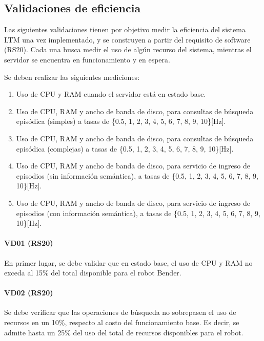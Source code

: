 \subsection{Validaciones de eficiencia}




Las siguientes validaciones tienen por objetivo medir la eficiencia del sistema LTM una vez implementado, y se construyen a partir del requisito de software (RS20). Cada una busca medir el uso de algún recurso del sistema, mientras el servidor se encuentra en funcionamiento y en espera. 

Se deben realizar las siguientes mediciones:
\begin{enumerate}
\item Uso de CPU y RAM cuando el servidor está en estado base.
\item Uso de CPU, RAM y ancho de banda de disco, para consultas de búsqueda episódica (simples) a tasas de \{0.5, 1, 2, 3, 4, 5, 6, 7, 8, 9, 10\}[Hz].
\item Uso de CPU, RAM y ancho de banda de disco, para consultas de búsqueda episódica (complejas) a tasas de \{0.5, 1, 2, 3, 4, 5, 6, 7, 8, 9, 10\}[Hz].
\item Uso de CPU, RAM y ancho de banda de disco, para servicio de ingreso de episodios (sin información semántica), a tasas de \{0.5, 1, 2, 3, 4, 5, 6, 7, 8, 9, 10\}[Hz].
\item Uso de CPU, RAM y ancho de banda de disco, para servicio de ingreso de episodios (con información semántica), a tasas de \{0.5, 1, 2, 3, 4, 5, 6, 7, 8, 9, 10\}[Hz].
\end{enumerate}

\paragraph{VD01 (RS20)}
En primer lugar, se debe validar que en estado base, el uso de CPU y RAM no exceda al 15\% del total disponible para el robot Bender.

\paragraph{VD02 (RS20)}
Se debe verificar que las operaciones de búsqueda no sobrepasen el uso de recursos en un 10\%, respecto al costo del funcionamiento base. Es decir, se admite hasta un 25\% del uso del total de recursos disponibles para el robot.

